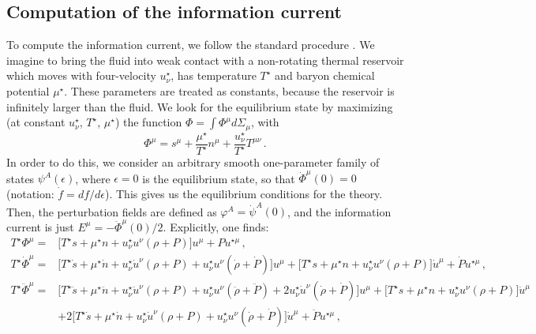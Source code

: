 \documentclass[a4paper, amsfonts, amssymb, amsmath, reprint, showkeys, nofootinbib, twoside, onecolumn,notitlepage]{revtex4-1}
\begin{document}
\subsection{Computation of the information current}

To compute the information current, we follow the standard procedure \cite{GavassinoCausality2021,
GavassinoStabilityCarter2022,GavassinoGENERIC2022}. We imagine to bring the fluid into weak contact with a non-rotating thermal reservoir which moves with four-velocity $u_\nu^\star$, has temperature $T^\star$ and baryon chemical potential $\mu^\star$. These parameters are treated as constants,  because the reservoir is infinitely larger than the fluid. We look for the equilibrium state by maximizing (at constant $u_\nu^\star$, $T^\star$, $\mu^\star$) the function $\Phi {=}\int \Phi^\mu d\Sigma_\mu$, with
\begin{equation}
\Phi^\mu = s^\mu +\dfrac{\mu^\star}{T^\star} n^\mu +\dfrac{u^\star_\nu}{T^\star} T^{\mu \nu} \, .
\end{equation}
In order to do this, we consider an arbitrary smooth one-parameter family of states $\psi^A(\epsilon)$, where $\epsilon=0$ is the equilibrium state, so that $\dot{\Phi}^\mu(0)=0$ (notation: $\dot{f}=df/d\epsilon$). This gives us the equilibrium conditions for the theory. Then, the perturbation fields are defined as $\varphi^A=\dot{\psi}^A(0)$, and the information current is just $E^\mu =-\ddot{\Phi}^\mu(0)/2$. Explicitly, one finds:
\begin{equation}
\begin{split}
T^\star \Phi^\mu ={}& \big[ T^\star s+\mu^\star n + u^\star_\nu u^\nu (\rho+P) \big]u^\mu +P u^{\star \mu} \, ,\\
T^\star \dot{\Phi}^\mu ={}& \big[ T^\star \dot{s}+\mu^\star \dot{n} + u^\star_\nu \dot{u}^\nu (\rho+P) +u^\star_\nu u^\nu (\dot{\rho}+\dot{P}) \big]u^\mu+ \big[ T^\star s+\mu^\star n + u^\star_\nu u^\nu (\rho+P) \big]\dot{u}^\mu +\dot{P} u^{\star \mu} \, ,\\
T^\star \ddot{\Phi}^\mu ={}& \big[ T^\star \ddot{s}+\mu^\star \ddot{n} + u^\star_\nu \ddot{u}^\nu (\rho+P) +u^\star_\nu u^\nu (\ddot{\rho}+\ddot{P})+2u^\star_\nu \dot{u}^\nu (\dot{\rho}+\dot{P}) \big]u^\mu+ \big[ T^\star s+\mu^\star n + u^\star_\nu u^\nu (\rho+P) \big]\ddot{u}^\mu \\
& +2\big[ T^\star \dot{s}+\mu^\star \dot{n} + u^\star_\nu \dot{u}^\nu (\rho+P) +u^\star_\nu u^\nu (\dot{\rho}+\dot{P}) \big]\dot{u}^\mu +\ddot{P} u^{\star \mu} \, ,\\
\end{split}
\end{equation}
\end{document}
